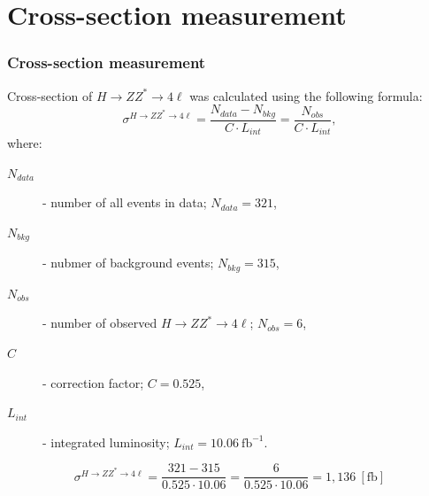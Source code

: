 \documentclass[aspectratio=1610, english]{beamer}
\newcommand{\hzz}{ H\rightarrow ZZ^{*}\rightarrow 4 \ell}
\begin{document}
\section{Cross-section measurement}
\begin{frame}
\frametitle{Cross-section measurement}
Cross-section of $\hzz$ was calculated using the following formula:
\begin{equation}
\sigma^{\hzz}=\frac{N_{data}-N_{bkg}}{C\cdot L_{int}}=\frac{N_{obs}}{C\cdot L_{int}} ,
\end{equation}
where:
\begin{description}
\item[$N_{data}$] - number of all events in data; $N_{data}=321$,
\item[$N_{bkg}$] - nubmer of background events; $N_{bkg}=315$,
\item[$N_{obs}$] - number of observed $\hzz$; $N_{obs}=6$,
\item[$C$] - correction factor; $C=0.525$,
\item[$L_{int}$] - integrated luminosity; $L_{int}=10.06 \: \mathrm{fb}^{-1}$.
\end{description}
\vspace{1cm}
\begin{equation}
\sigma^{\hzz}=\frac{321-315}{0.525\cdot 10.06}=\frac{6}{0.525\cdot 10.06}=1,136 \: [\mathrm{fb}]
\end{equation}

\end{frame}
\end{document}

